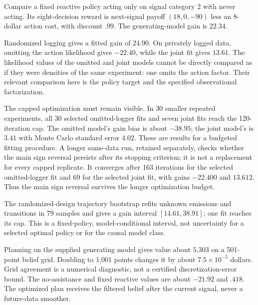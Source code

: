 Compare a fixed reactive policy acting only on signal category 2 with
never acting. Its eight-decision reward is next-signal payoff
$(18,0,-90)$ less an $8$-dollar action cost, with discount $.99$.
The generating-model gain is $22.34$.

\begin{table}[htbp]\centering\small

\caption{Fitted hidden-state models with unknown emissions. These are
model-conditional estimation comparisons, not a general identification
theorem for observational POMDPs.}
\end{table}

Randomized logging gives a fitted gain of $24.90$. On privately logged
data, omitting the action likelihood gives $-22.40$, while the joint
fit gives $13.61$. The likelihood values of the omitted and joint
models cannot be directly compared as if they were densities of the
same experiment: one omits the action factor. Their relevant comparison
here is the policy target and the specified observational factorization.

The capped optimization must remain visible. In 30 smaller repeated
experiments, all 30 selected omitted-logger fits and seven joint fits
reach the 120-iteration cap. The omitted model's gain bias is about
$-38.95$; the joint model's is $3.41$ with Monte Carlo standard error
$4.02$. These are results for a budgeted fitting procedure. A longer
same-data run, retained separately, checks whether the main sign
reversal persists after its stopping criterion; it is not a replacement
for every capped replicate.
It converges after 163 iterations for the selected omitted-logger fit
and 69 for the selected joint fit, with gains $-22.400$ and $13.612$.
Thus the main sign reversal survives the longer optimization budget.

The randomized-design trajectory bootstrap refits unknown emissions
and transitions in 79 samples and gives a gain interval
$[14.61,38.91]$; one fit reaches its cap. This is a fixed-policy,
model-conditional interval, not uncertainty for a selected optimal
policy or for the causal model class.

Planning on the supplied generating model gives value about $5.303$
on a 501-point belief grid. Doubling to 1,001 points changes it by
about $7.5\times10^{-5}$ dollars. Grid agreement is a numerical
diagnostic, not a certified discretization-error bound. The no-assistance
and fixed reactive values are about $-21.92$ and $.418$.
The optimized plan receives the filtered belief after the current
signal, never a future-data smoother.

